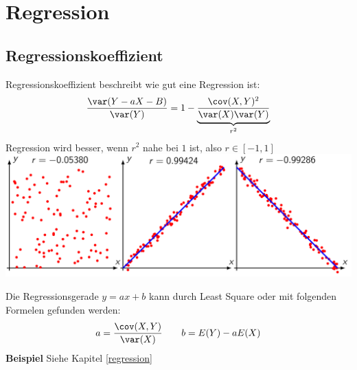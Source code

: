 \section{Regression}
\subsection{Regressionskoeffizient}
Regressionskoeffizient beschreibt wie gut eine Regression ist:
\[
\frac{\var(Y-aX-B)}{\var(Y)} = 1 - \underbrace{\frac{\cov(X, Y)^2}{\var(X)\var(Y)}}_{r^2}
\]
Regression wird besser, wenn $r^2$ nahe bei $1$ ist, also $r \in [-1,1]$~\\
\includegraphics[width=0.9\linewidth]{Images/regressionskoeffizient}

Die Regressionsgerade $y = ax + b$ kann durch Least Square oder mit folgenden Formelen gefunden werden:
\[
a = \frac{\cov(X, Y)}{\var(X)} \qquad b = E(Y) - aE(X)
\]
\noindent\textbf{Beispiel} Siehe Kapitel \ref{regression}

